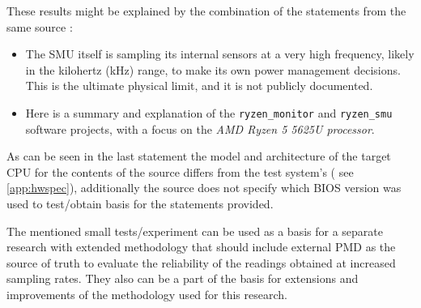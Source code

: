These results might be explained by the combination of the statements from the
same source \parencite{ryzen_managment_linux}:

\begin{itemize}
  \item The \gls{SMU} itself is sampling its internal sensors at a very high
    frequency, likely in the kilohertz (kHz) range, to make its own power
    management decisions.
    This is the ultimate physical limit, and it is not publicly documented.
  \item Here is a summary and explanation of the \texttt{ryzen\_monitor} and
    \texttt{ryzen\_smu} software projects, with a focus on the
    \emph{AMD Ryzen 5 5625U processor}.
\end{itemize}
 \parencite{ryzen_managment_linux}

As can be seen in the last statement the model and architecture of the target
\gls{CPU} for the contents of the source differs from the test system's (
see \cref{app:hwspec}), additionally the source does not specify which
\gls{BIOS} version was used to test/obtain basis for the statements provided.

The mentioned small tests/experiment can be used as a basis for a separate
research with extended methodology that should include external \gls{PMD}
as the source of truth to evaluate the reliability of the readings
obtained at increased sampling rates. They also can be a part of the
basis for extensions and improvements of the methodology used for this
research.

